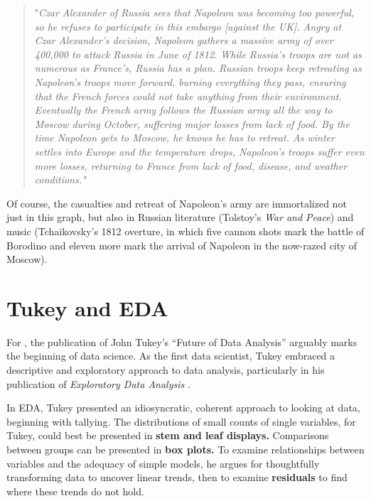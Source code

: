 \documentclass[
  openany]{book}
\begin{document}
\begin{quote}
"\emph{Czar Alexander of Russia sees that Napoleon was becoming too powerful, so he refuses to participate in this embargo {[}against the UK{]}. Angry at Czar Alexander's decision, Napoleon gathers a massive army of over 400,000 to attack Russia in June of 1812. While Russia's troops are not as numerous as France's, Russia has a plan. Russian troops keep retreating as Napoleon's troops move forward, burning everything they pass, ensuring that the French forces could not take anything from their environment. Eventually the French army follows the Russian army all the way to Moscow during October, suffering major losses from lack of food. By the time Napoleon gets to Moscow, he knows he has to retreat. As winter settles into Europe and the temperature drops, Napoleon's troops suffer even more losses, returning to France from lack of food, disease, and weather conditions."}
\end{quote}

Of course, the casualties and retreat of Napoleon's army are immortalized not just in this graph, but also in Russian literature (Tolstoy's \emph{War and Peace}) and music (Tchaikovsky's 1812 overture, in which five cannon shots mark the battle of Borodino and eleven more mark the arrival of Napoleon in the now-razed city of Moscow).

\hypertarget{tukey-and-eda}{%
\section{Tukey and EDA}\label{tukey-and-eda}}

For \citet{donoho2015fifty}, the publication of John Tukey's ``Future of Data Analysis'' \citep{tukey1962future} arguably marks the beginning of data science. As the first data scientist, Tukey embraced a descriptive and exploratory approach to data analysis, particularly in his publication of \emph{Exploratory Data Analysis} \citep{tukey1977eda}.

In EDA, Tukey presented an idiosyncratic, coherent approach to looking at data, beginning with tallying. The distributions of small counts of single variables, for Tukey, could best be presented in \textbf{stem and leaf displays.} Comparisons between groups can be presented in \textbf{box plots.} To examine relationships between variables and the adequacy of simple models, he argues for thoughtfully transforming data to uncover linear trends, then to examine \textbf{residuals} to find where these trends do not hold.
\end{document}
